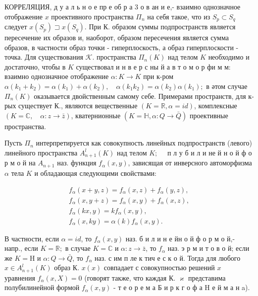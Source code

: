 \documentclass[10pt]{article}
\begin{document}
КОРРЕЛЯЦИЯ, д у а л ь н о е пр е об р а 3 о в ан и е,- взаимно однозначное отображение $x$ проективного пространства $\Pi_{n}$ на себя такое, что из $S_{p} \subset S_{q}$ следует $x\left(S_{p}\right) \sqsupset x\left(S_{q}\right)$. При К. образом суммы подпространств является пересечение их образов и, наоборот, образом пересечения является сумма образов, в частности образ точки - гиперплоскость, а образ гиперплоскости - точка. Для существования $\mathcal{K}$. пространства $\Pi_{n}(K)$ над телом $K$ необходимо и достаточно, чтобы в $K$ существовал и н в е р с ны й а в т о м о р фи м м: взаимно однозначное отображение $\alpha: K \rightarrow K$ при к-ром $\alpha\left(k_{1}+k_{2}\right)=\alpha\left(k_{1}\right)+\alpha\left(k_{2}\right), \quad \alpha\left(k_{1} k_{2}\right)=\alpha\left(k_{2}\right) \alpha\left(k_{1}\right) ;$ в әтом случае $\Pi_{n}(K)$ оказывается двойственным самому себе. Примерами пространств, для к-рых существует К., являются вещественные $(K=\mathbb{R}, \alpha=i d)$, комплексные $(K=\mathbb{C}, \quad \alpha: z \rightarrow \bar{z})$, кватернионные $(K=\mathbb{H}, \alpha: Q \rightarrow \bar{Q})$ проективные пространства.



Пусть $\Pi_{n}$ интерпретируется как совокупность линейных подпространств (левого) линейного пространства $A_{n+1}^{l}(K)$ над телом $K ; \quad$ п л у б и л и не й н о й ф о р м о й на $A_{n+1}$ наз. функция $f_{\alpha}(x, y)$, зависящая от инверсного автоморфизма $\alpha$ тела $K$ и обладающая следующими свойствами:



\[

\begin{gathered}

f_{\alpha}(x+y, z)=f_{\alpha}(x, z)+f_{\alpha}(y, z), \\

f_{\alpha}(x, y+z)=f_{\alpha}(x, y)+f_{\alpha}(x, z), \\

f_{\alpha}(k x, y)=k f_{\alpha}(x, y), \\

f_{\alpha}(x, k y)=\alpha(k) f_{\alpha}(x, y) .

\end{gathered}

\]



В частности, если $\alpha=i d$, то $f_{\alpha}(x, y)$ наз. б и л и н е йн о й ф о р м о й,- напр., если $K=\mathbb{R} ;$ в случае $K=\mathbb{C}$ и $\alpha: z \rightarrow \bar{z}$, то $f_{\alpha}$ наз. э р м и т о в о й; если же $K=\mathrm{H}$ и $\alpha: Q \rightarrow \bar{Q}$, то $f_{\alpha}$ наз. с им п ле к тич е с к о й. Тогда для любого $x \in A_{n+1}^{l}(K)$ образ К. $x(x)$ совпадает с совокупностью решений $x$ уравнения $f_{\alpha}(x, X)=0$ (говорят также, что каждая К. $\varkappa$ представима полубилинейной формой $f_{\alpha}(x, y)$ - т е о р е м а Б и р к г о ф а H е й м а н a).
\end{document}
